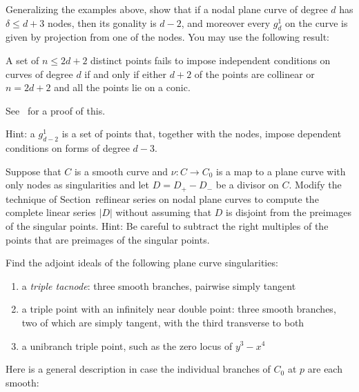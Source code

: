 \begin{exercise}
Generalizing the examples above, show that if a nodal plane curve of degree $d$ has $\delta\leq d+3$ nodes,
then its gonality is $d-2$, and moreover every $g^1_d$ on the curve is given by projection from one of the nodes.
You may use the following result:
\begin{proposition}
 A set of $n \leq 2d+ 2$ distinct
points fails to impose independent conditions on curves of degree
$d$ if and only if either $d + 2$ of the points  are collinear or $n = 2d + 2$ and all the points lie
on a conic.
\end{proposition} 
See~\cite[p. 302]{MR1376653} for a proof of this.

Hint: a $g^1_{d-2}$ is a set of points that, together with the nodes, impose dependent conditions on forms of degree $d-3$.
\end{exercise}

\begin{exercise}\label{general case of divisors on nodal curves}
Suppose that $C$ is a smooth curve and $\nu: C \to C_0$ is a map to a plane curve with
only nodes as singularities and let $D = D_{+}-D_{-}$ be a divisor on $C$. Modify the 
technique of Section~ref{linear series on nodal plane curves} to compute the complete
linear series $|D|$ without assuming that $D$ is disjoint from the preimages of the singular
points. 
Hint: Be careful to subtract the right multiples of the points that are preimages of the singular
points.
\end{exercise}


\begin{exercise}
Find the adjoint ideals of the following plane curve singularities:
\begin{enumerate}
\item a \emph{triple tacnode}: three smooth branches, pairwise simply tangent
\item a triple point with an infinitely near double point: three smooth branches, two of which are simply tangent, with the third transverse to both
\item a unibranch triple point, such as the zero locus of $y^3-x^4$
\end{enumerate}
\end{exercise}

Here is a  general description in case the individual branches of $C_0$ at $p$ are each smooth:

